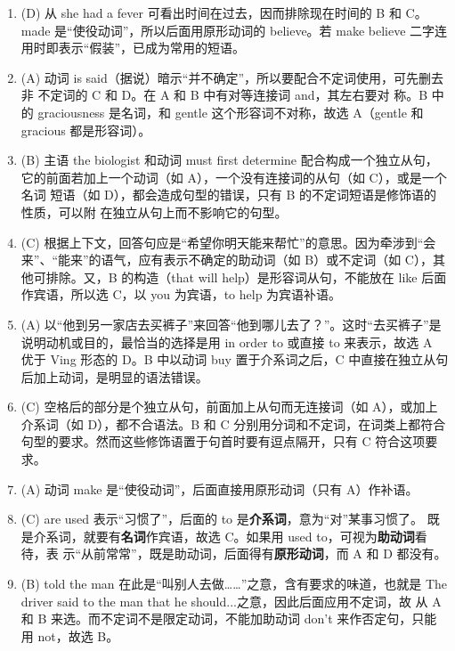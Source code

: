 \documentclass{yufa}
\begin{document}
\begin{enumerate}
\item (D) 从 she had a fever 可看出时间在过去，因而排除现在时间的 B 和 C。made 是“使役动词”，所以后面用原形动词的 believe。若 make believe 二字连用时即表示“假装”，已成为常用的短语。

\item (A) 动词 is said（据说）暗示“并不确定”，所以要配合不定词使用，可先删去非
  不定词的 C 和 D。在 A 和 B 中有对等连接词 and，其左右要对
  称。B 中的 graciousness 是名词，和 gentle 这个形容词不对称，故选 A（gentle
  和 gracious 都是形容词）。

\item (B) 主语 the biologist 和动词 must first determine 配合构成一个独立从句，
  它的前面若加上一个动词（如 A），一个没有连接词的从句（如 C），或是一个名词
  短语（如 D），都会造成句型的错误，只有 B 的不定词短语是修饰语的性质，可以附
  在独立从句上而不影响它的句型。
\item (C) 根据上下文，回答句应是“希望你明天能来帮忙”的意思。因为牵涉到“会来”、“能来”的语气，应有表示不确定的助动词（如 B）或不定词（如 C），其他可排除。又，B 的构造（that will help）是形容词从句，不能放在 like 后面作宾语，所以选 C，以 you 为宾语，to help 为宾语补语。

\item (A) 以“他到另一家店去买裤子”来回答“他到哪儿去了？”。这时“去买裤子”是说明动机或目的，最恰当的选择是用 in order to 或直接 to 来表示，故选 A 优于 Ving 形态的 D。B 中以动词 buy 置于介系词之后，C 中直接在独立从句后加上动词，是明显的语法错误。


\item  (C) 空格后的部分是个独立从句，前面加上从句而无连接词（如 A），或加上介系词（如 D），都不合语法。B 和 C 分别用分词和不定词，在词类上都符合句型的要求。然而这些修饰语置于句首时要有逗点隔开，只有 C 符合这项要求。

\item (A) 动词 make 是“使役动词”，后面直接用原形动词（只有 A）作补语。

\item (C) are used 表示“习惯了”，后面的 to 是\textbf{介系词}，意为“对”某事习惯了。
  既是介系词，就要有\textbf{名词}作宾语，故选 C。如果用 used to，可视为\textbf{助动词}看待，表
  示“从前常常”，既是助动词，后面得有\textbf{原形动词}，而 A 和 D 都没有。

\item (B) told the man 在此是“叫别人去做……”之意，含有要求的味道，也就是 The
  driver said to the man that he should...之意，因此后面应用不定词，故
  从 A 和 B 来选。而不定词不是限定动词，不能加助动词 don’t 来作否定句，只能
  用 not，故选 B。


\end{enumerate}
\end{document}
